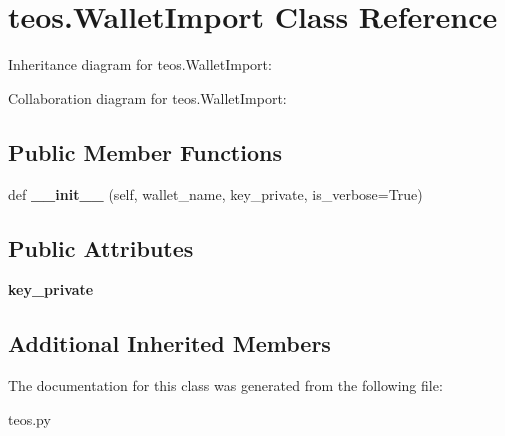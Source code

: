 \hypertarget{classteos_1_1WalletImport}{}\section{teos.\+Wallet\+Import Class Reference}
\label{classteos_1_1WalletImport}


Inheritance diagram for teos.\+Wallet\+Import\+:


Collaboration diagram for teos.\+Wallet\+Import\+:
\subsection*{Public Member Functions}
\begin{DoxyCompactItemize}
\item 
\mbox{\label{classteos_1_1WalletImport_aa9f66a49fade61f79fabbacbd062396a}} 
def {\bfseries \+\_\+\+\_\+init\+\_\+\+\_\+} (self, wallet\+\_\+name, key\+\_\+private, is\+\_\+verbose=True)
\end{DoxyCompactItemize}
\subsection*{Public Attributes}
\begin{DoxyCompactItemize}
\item 
\mbox{\label{classteos_1_1WalletImport_a87eedbac324d5f8143e507e06eb0b2e8}} 
{\bfseries key\+\_\+private}
\end{DoxyCompactItemize}
\subsection*{Additional Inherited Members}


The documentation for this class was generated from the following file\+:\begin{DoxyCompactItemize}
\item 
teos.\+py\end{DoxyCompactItemize}
